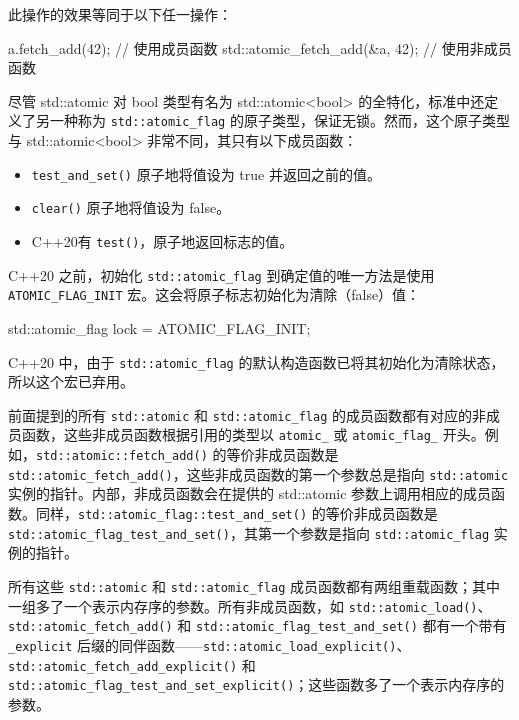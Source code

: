 此操作的效果等同于以下任一操作：

\begin{cpp}
a.fetch_add(42);               // 使用成员函数
std::atomic_fetch_add(&a, 42); // 使用非成员函数
\end{cpp}

尽管 std::atomic 对 bool 类型有名为 std::atomic<bool> 的全特化，标准中还定义了另一种称为 \verb|std::atomic_flag| 的原子类型，保证无锁。然而，这个原子类型与 std::atomic<bool> 非常不同，其只有以下成员函数：

\begin{itemize}
\item
\verb|test_and_set()| 原子地将值设为 true 并返回之前的值。

\item
\verb|clear()| 原子地将值设为 false。

\item
C++20有 \verb|test()|，原子地返回标志的值。
\end{itemize}

C++20 之前，初始化 \verb|std::atomic_flag| 到确定值的唯一方法是使用 \verb|ATOMIC_FLAG_INIT| 宏。这会将原子标志初始化为清除（false）值：

\begin{cpp}
std::atomic_flag lock = ATOMIC_FLAG_INIT;
\end{cpp}

C++20 中，由于 \verb|std::atomic_flag| 的默认构造函数已将其初始化为清除状态，所以这个宏已弃用。

前面提到的所有 \verb|std::atomic| 和 \verb|std::atomic_flag| 的成员函数都有对应的非成员函数，这些非成员函数根据引用的类型以 \verb|atomic_| 或 \verb|atomic_flag_| 开头。例如，\verb|std::atomic::fetch_add()| 的等价非成员函数是 \verb|std::atomic_fetch_add()|，这些非成员函数的第一个参数总是指向 \verb|std::atomic| 实例的指针。内部，非成员函数会在提供的 std::atomic 参数上调用相应的成员函数。同样，\verb|std::atomic_flag::test_and_set()| 的等价非成员函数是 \verb|std::atomic_flag_test_and_set()|，其第一个参数是指向 \verb|std::atomic_flag| 实例的指针。

所有这些 \verb|std::atomic| 和 \verb|std::atomic_flag| 成员函数都有两组重载函数；其中一组多了一个表示内存序的参数。所有非成员函数，如 \verb|std::atomic_load()|、\verb|std::atomic_fetch_add()| 和 \verb|std::atomic_flag_test_and_set()| 都有一个带有 \verb|_explicit| 后缀的同伴函数——\verb|std::atomic_load_explicit()|、\verb|std::atomic_fetch_add_explicit()| 和 \verb|std::atomic_flag_test_and_set_explicit()|；这些函数多了一个表示内存序的参数。

